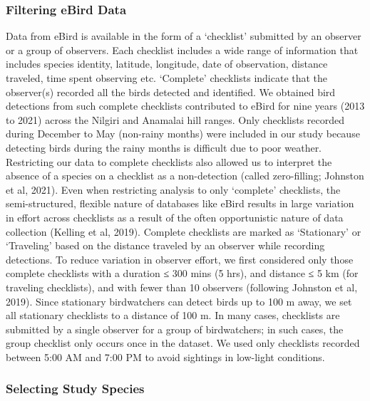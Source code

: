 \subsubsection*{Filtering eBird Data}

Data from eBird is available in the form of a `checklist' submitted by an observer or a group of observers.
Each checklist includes a wide range of information that includes species identity, latitude, longitude, date of observation, distance traveled, time spent observing etc.
`Complete' checklists indicate that the observer(s) recorded all the birds detected and identified.
We obtained bird detections from such complete checklists contributed to eBird for nine years (2013 to 2021) across the Nilgiri and Anamalai hill ranges.
Only checklists recorded during December to May (non-rainy months) were included in our study because detecting birds during the rainy months is difficult due to poor weather.
Restricting our data to complete checklists also allowed us to interpret the absence of a species on a checklist as a non-detection (called zero-filling; Johnston et al, 2021).
Even when restricting analysis to only `complete' checklists, the semi-structured, flexible nature of databases like eBird results in large variation in effort across checklists as a result of the often opportunistic nature of data collection (Kelling et al, 2019).
Complete checklists are marked as `Stationary' or `Traveling' based on the distance traveled by an observer while recording detections.
To reduce variation in observer effort, we first considered only those complete checklists with a duration ≤ 300 mins (5 hrs), and distance ≤ 5 km (for traveling checklists), and with fewer than 10 observers (following Johnston et al, 2019).
Since stationary birdwatchers can detect birds up to 100 m away, we set all stationary checklists to a distance of 100 m.
In many cases, checklists are submitted by a single observer for a group of birdwatchers; in such cases, the group checklist only occurs once in the dataset.
We used only checklists recorded between 5:00 AM and 7:00 PM to avoid sightings in low-light conditions.

\subsubsection*{Selecting Study Species}

